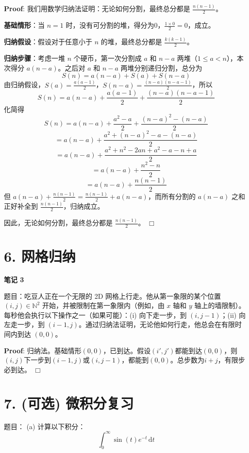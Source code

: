 \documentclass[11pt]{article}
\def\endproofmark{$\Box$}
\newenvironment{proof}{\par{\bf Proof}:}{\endproofmark\smallskip}
\begin{document}
\begin{proof}
我们用数学归纳法证明：无论如何分割，最终总分都是 $\frac{n(n-1)}{2}$。

\textbf{基础情形}：当 $n=1$ 时，没有可分割的堆，得分为0，$\frac{1 \times 0}{2} = 0$，成立。

\textbf{归纳假设}：假设对于任意小于 $n$ 的堆，最终总分都是 $\frac{k(k-1)}{2}$。

\textbf{归纳步骤}：考虑一堆 $n$ 个硬币，第一次分割成 $a$ 和 $n-a$ 两堆（$1 \leq a < n$），本次得分 $a(n-a)$。之后对 $a$ 和 $n-a$ 两堆分别递归分割，总分为
\[
S(n) = a(n-a) + S(a) + S(n-a)
\]
由归纳假设，$S(a) = \frac{a(a-1)}{2}$，$S(n-a) = \frac{(n-a)(n-a-1)}{2}$，所以
\[
S(n) = a(n-a) + \frac{a(a-1)}{2} + \frac{(n-a)(n-a-1)}{2}
\]
化简得
\[
S(n) = a(n-a) + \frac{a^2 - a}{2} + \frac{(n-a)^2 - (n-a)}{2}
\]
\[
= a(n-a) + \frac{a^2 + (n-a)^2 - a - (n-a)}{2}
\]
\[
= a(n-a) + \frac{a^2 + n^2 - 2an + a^2 - a - n + a}{2}
\]
\[
= a(n-a) + \frac{n^2 - n}{2}
\]
\[
= a(n-a) + \frac{n(n-1)}{2}
\]
但 $a(n-a) + \frac{n(n-1)}{2} = \frac{n(n-1)}{2} + a(n-a)$，而所有分割的 $a(n-a)$ 之和正好补全到 $\frac{n(n-1)}{2}$，归纳成立。

因此，无论如何分割，最终总分都是 $\frac{n(n-1)}{2}$。
\end{proof}

\section*{6. 网格归纳}
\textbf{笔记 3}

题目：吃豆人正在一个无限的 2D 网格上行走。他从第一象限的某个位置 $(i, j) \in \mathbb{N}^2$ 开始，并被限制在第一象限内（例如，由 $x$ 轴和 $y$ 轴上的墙限制）。每秒他会执行以下操作之一（如果可能）：(i) 向下走一步，到 $(i, j-1)$；(ii) 向左走一步，到 $(i-1, j)$。通过归纳法证明，无论他如何行走，他总会在有限时间内到达 $(0, 0)$。

\begin{proof}
归纳法。基础情形$(0,0)$，已到达。假设$(i',j')$都能到达$(0,0)$，则$(i,j)$下一步到$(i-1,j)$或$(i,j-1)$，都能到$(0,0)$。总步数为$i+j$，有限步必到达。
\end{proof}

\section*{7. (可选) 微积分复习}

题目：
(a) 计算以下积分：
$$
\int_0^{\infty} \sin(t) e^{-t} \, \mathrm{d}t
$$
\end{document}
